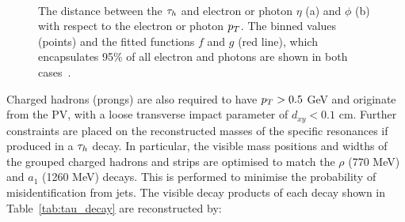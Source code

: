 \begin{figure}[t]
\centering
     \\
\caption[Plots of the fit performed for dynamical strip sizes for the HPS algorithm.]{The distance between the $\tau_{h}$ and electron or photon $\eta$ (a) and $\phi$ (b) with respect to the electron or photon $p_{T}$. The binned values (points) and the fitted functions $f$ and $g$ (red line), which encapsulates 95\% of all electron and photons are shown in both cases~\cite{Sirunyan:2018pgf}.}
\label{fig:hps}
\end{figure}

Charged hadrons (prongs) are also required to have $p_{T} > 0.5$ GeV and originate from the \ac{PV}, with a loose transverse impact parameter of $d_{xy} < 0.1$ cm.
Further constraints are placed on the reconstructed masses of the specific resonances if produced in a $\tau_{h}$ decay.
In particular, the visible mass positions and widths of the grouped charged hadrons and strips are optimised to match the $\rho$ (770 MeV) and $a_1$ (1260 MeV) decays.
This is performed to minimise the probability of misidentification from jets.
The visible decay products of each decay shown in Table~\ref{tab:tau_decay} are reconstructed by:

